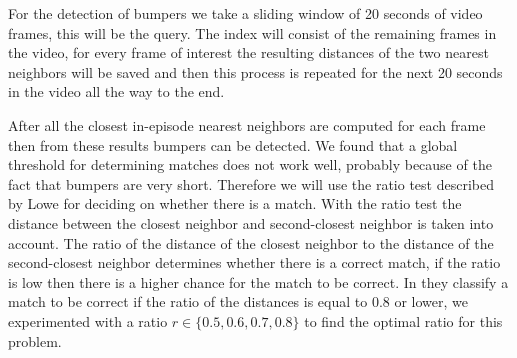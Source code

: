 \documentclass{report}
\begin{document}
For the detection of bumpers we take a sliding window of 20 seconds of video frames, this will be the query. The index will consist of the remaining frames in the video, for every frame of interest the resulting distances of the two nearest neighbors will be saved and then this process is repeated for the next 20 seconds in the video all the way to the end.

After all the closest in-episode nearest neighbors are computed for each frame then from these results bumpers can be detected. We found that a global threshold for determining matches does not work well, probably because of the fact that bumpers are very short. Therefore we will use the ratio test described by Lowe \cite{lowe2004distinctive} for deciding on whether there is a match. With the ratio test the distance between the closest neighbor and second-closest neighbor is taken into account. The ratio of the distance of the closest neighbor to the distance of the second-closest neighbor determines whether there is a correct match, if the ratio is low then there is a higher chance for the match to be correct. In \cite{lowe2004distinctive} they classify a match to be correct if the ratio of the distances is equal to 0.8 or lower, we experimented with a ratio $r \in \{0.5, 0.6, 0.7, 0.8\}$ to find the optimal ratio for this problem.
\end{document}
